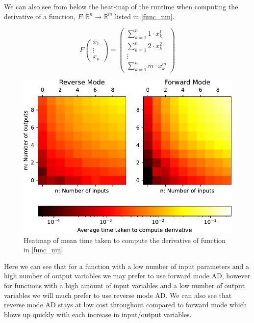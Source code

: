 \documentclass{article}
\begin{document}
We can also see from \cite{github} below the heat-map of the runtime when computing the derivative of a function, $F: \mathbb{R}^n \rightarrow \mathbb{R}^m$ listed in \eqref{func_nm}.

\begin{equation}
    F \begin{pmatrix}
        x_1 \\ \vdots \\ x_n
    \end{pmatrix} = \begin{pmatrix}
        \sum_{k=1}^n 1 \cdot x_k^1 \\ \sum_{k=1}^n 2 \cdot x_{k}^{2} \\ \vdots \\ \sum_{k=1}^n m \cdot x_{k}^{m}
    \end{pmatrix}
    \label{func_nm}
\end{equation}


\begin{figure}[h]
    \centering
    \includegraphics{images/Graph_HeatmapTimeDiff.pdf}
    \caption{Heatmap of mean time taken to compute the derivative of function in \eqref{func_nm}}
    \label{fig:heatmap}
\end{figure}

Here we can see that for a function with a low number of input parameters and a high number of output variables we may prefer to use forward mode AD, however for functions with a high amount of input variables and a low number of output variables we will much prefer to use reverse mode AD. We can also see that reverse mode AD stays at low cost throughout compared to forward mode which blows up quickly with each increase in input/output variables.
\end{document}
